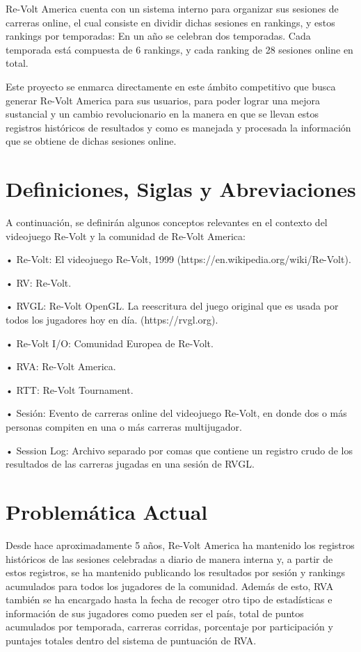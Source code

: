 Re-Volt America cuenta con un sistema interno para organizar sus sesiones de carreras online, el cual consiste en dividir dichas sesiones en rankings, y estos rankings por temporadas: En un año se celebran dos temporadas. Cada temporada está compuesta de 6 rankings, y cada ranking de 28 sesiones online en total.

Este proyecto se enmarca directamente en este ámbito competitivo que busca generar Re-Volt America para sus usuarios, para poder lograr una mejora sustancial y un cambio revolucionario en la manera en que se llevan estos registros históricos de resultados y como es manejada y procesada la información que se obtiene de dichas sesiones online.

\section{Definiciones, Siglas y Abreviaciones}
A continuación, se definirán algunos conceptos relevantes en el contexto del videojuego Re-Volt y la comunidad de Re-Volt America:

•	Re-Volt: El videojuego Re-Volt, 1999 (https://en.wikipedia.org/wiki/Re-Volt).

•	RV: Re-Volt.

•	RVGL: Re-Volt OpenGL. La reescritura del juego original que es usada por todos los jugadores hoy en día. (https://rvgl.org).

•	Re-Volt I/O: Comunidad Europea de Re-Volt.

•	RVA: Re-Volt America.

•	RTT: Re-Volt Tournament.

•	Sesión: Evento de carreras online del videojuego Re-Volt, en donde dos o más personas compiten en una o más carreras multijugador.

•	Session Log: Archivo separado por comas que contiene un registro crudo de los resultados de las carreras jugadas en una sesión de RVGL.

\section{Problemática Actual}
Desde hace aproximadamente 5 años, Re-Volt America ha mantenido los registros históricos de las sesiones celebradas a diario de manera interna y, a partir de estos registros, se ha mantenido publicando los resultados por sesión y rankings acumulados para todos los jugadores de la comunidad. Además de esto, RVA también se ha encargado hasta la fecha de recoger otro tipo de estadísticas e información de sus jugadores como pueden ser el país, total de puntos acumulados por temporada, carreras corridas, porcentaje por participación y puntajes totales dentro del sistema de puntuación de RVA.

